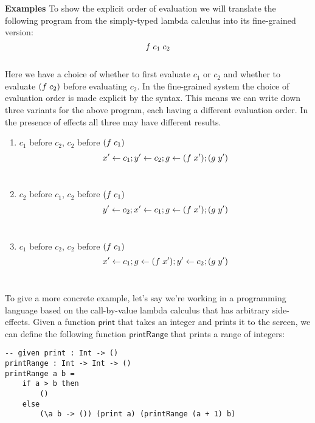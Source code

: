 {%
\textbf{Examples}
To show the explicit order of evaluation we will translate the following program from the simply-typed lambda calculus into its fine-grained version:\\
\[f \; c_1 \; c_2\]\\
Here we have a choice of whether to first evaluate $c_1$ or $c_2$ and whether to evaluate $(f \; c_2)$ before evaluating $c_2$.
In the fine-grained system the choice of evaluation order is made explicit by the syntax.
This means we can write down three variants for the above program, each having a different evaluation order.
In the presence of effects all three may have different results.

\begin{enumerate}
\item $c_1$ before $c_2$, $c_2$ before $(f \; c_1)$ \\\indent
\[x' \leftarrow c_1 ; y' \leftarrow c_2 ; g \leftarrow (f \; x') ; (g \; y')\]\\
\item $c_2$ before $c_1$, $c_2$ before $(f \; c_1)$\\\indent
\[y' \leftarrow c_2 ; x' \leftarrow c_1 ; g \leftarrow (f \; x') ; (g \; y')\]\\
\item $c_1$ before $c_2$, $c_2$ before $(f \; c_1)$\\\indent
\[x' \leftarrow c_1 ; g \leftarrow (f \; x') ; y' \leftarrow c_2 ; (g \; y')\]\\
\end{enumerate}

To give a more concrete example, let's say we're working in a programming language based on the call-by-value lambda calculus that has arbitrary side-effects. Given a function $\mathsf{print}$ that takes an integer and prints it to the screen, we can define the following function $\mathsf{printRange}$ that prints a range of integers:
\begin{verbatim}
-- given print : Int -> ()
printRange : Int -> Int -> ()
printRange a b =
	if a > b then
		()
	else
		(\a b -> ()) (print a) (printRange (a + 1) b)
\end{verbatim}

}
